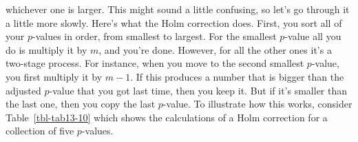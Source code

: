 \documentclass[
  a4paper,
]{book}
\begin{document}
whichever one is larger. This might sound a little confusing, so let's
go through it a little more slowly. Here's what the Holm correction
does. First, you sort all of your \(p\)-values in order, from smallest
to largest. For the smallest \(p\)-value all you do is multiply it by
\(m\), and you're done. However, for all the other ones it's a two-stage
process. For instance, when you move to the second smallest \(p\)-value,
you first multiply it by \(m - 1\). If this produces a number that is
bigger than the adjusted \(p\)-value that you got last time, then you
keep it. But if it's smaller than the last one, then you copy the last
\(p\)-value. To illustrate how this works, consider
Table~\ref{tbl-tab13-10} which shows the calculations of a Holm
correction for a collection of five \(p\)-values.

\hypertarget{tbl-tab13-10}{}
 
  \providecommand{\huxb}[2]{\arrayrulecolor[RGB]{#1}\global\arrayrulewidth=#2pt}
  \providecommand{\huxvb}[2]{\color[RGB]{#1}\vrule width #2pt}
  \providecommand{\huxtpad}[1]{\rule{0pt}{#1}}
  \providecommand{\huxbpad}[1]{\rule[-#1]{0pt}{#1}}
\end{document}
